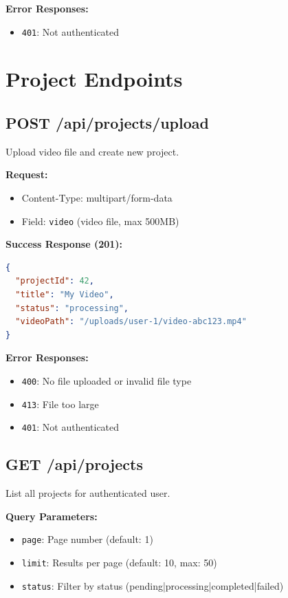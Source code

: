 \textbf{Error Responses:}
\begin{itemize}
    \item \texttt{401}: Not authenticated
\end{itemize}

\section{Project Endpoints}

\subsection{POST /api/projects/upload}

Upload video file and create new project.

\textbf{Request:}
\begin{itemize}
    \item Content-Type: multipart/form-data
    \item Field: \texttt{video} (video file, max 500MB)
\end{itemize}

\textbf{Success Response (201):}
\begin{lstlisting}[language=JSON]
{
  "projectId": 42,
  "title": "My Video",
  "status": "processing",
  "videoPath": "/uploads/user-1/video-abc123.mp4"
}
\end{lstlisting}

\textbf{Error Responses:}
\begin{itemize}
    \item \texttt{400}: No file uploaded or invalid file type
    \item \texttt{413}: File too large
    \item \texttt{401}: Not authenticated
\end{itemize}

\subsection{GET /api/projects}

List all projects for authenticated user.

\textbf{Query Parameters:}
\begin{itemize}
    \item \texttt{page}: Page number (default: 1)
    \item \texttt{limit}: Results per page (default: 10, max: 50)
    \item \texttt{status}: Filter by status (pending|processing|completed|failed)
\end{itemize}

